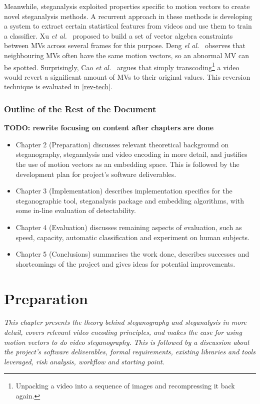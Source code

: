 \documentclass[12pt,british,twoside,notitlepage,usenames,dvipsnames,hypens,final]{report}
\numberwithin{equation}{section}
\numberwithin{figure}{section}
\begin{document}
Meanwhile, steganalysis exploited properties specific to motion vectors to create novel steganalysis methods. A recurrent approach in these methods is developing a system to extract certain statistical features from videos and use them to train a classifier. Xu \emph{et al.}~\cite{xu2013video} proposed to build a set of vector algebra constraints between MVs across several frames for this purpose. Deng \emph{el al.}~\cite{deng2012digital} observes that neighbouring MVs often have the same motion vectors, so an abnormal MV can be spotted. Surprisingly, Cao \emph{et al.}~\cite{cao2012video} argues that simply transcoding\footnote{Unpacking a video into a sequence of images and recompressing it back again.} a video would revert a significant amount of MVs to their original values. This reversion technique is evaluated in \ref{rev-tech}.

\subsection*{Outline of the Rest of the Document}
\textbf{TODO: rewrite focusing on content after chapters are done}
\begin{itemize}
\item Chapter 2 (Preparation) discusses relevant theoretical background on steganography, steganalysis and video encoding in more detail, and justifies the use of motion vectors as an embedding space. This is followed by the development plan for project's software deliverables. 
\item Chapter 3 (Implementation) describes implementation specifics for the steganographic tool, steganalysis package and embedding algorithms, with some in-line evaluation of detectability.
\item Chapter 4 (Evaluation) discusses remaining aspects of evaluation, such as speed, capacity, automatic classification and experiment on human subjects.
\item Chapter 5 (Conclusions) summarises the work done, describes successes and shortcomings of the project and gives ideas for potential improvements.
\end{itemize}
 

\cleardoublepage
\chapter{Preparation}

\textit{This chapter presents the theory behind steganography and steganalysis in more detail, covers relevant video encoding principles, and makes the case for using motion vectors to do video steganography. This is followed by a discussion about the project's software deliverables, formal requirements, existing libraries and tools leveraged, risk analysis, workflow and starting point.}
\end{document}
